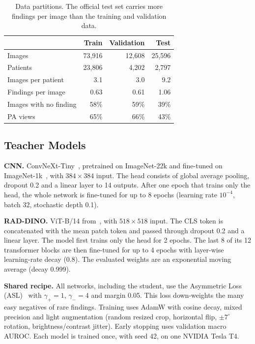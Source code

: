 \documentclass[conference]{IEEEtran}
\begin{document}
\begin{table}[t]
\centering
\caption{Data partitions. The official test set carries more findings per image than the training and validation data.}
\label{tab:data}
\begin{tabular}{@{}lrrr@{}}
\toprule
 & Train & Validation & Test \\
\midrule
Images           & 73,916 & 12,608 & 25,596 \\
Patients         & 23,806 & 4,202  & 2,797 \\
Images per patient & 3.1 & 3.0 & 9.2 \\
Findings per image & 0.63 & 0.61 & 1.06 \\
Images with no finding & 58\% & 59\% & 39\% \\
PA views         & 65\% & 66\% & 43\% \\
\bottomrule
\end{tabular}
\end{table}

\subsection{Teacher Models}
\textbf{CNN.} ConvNeXt-Tiny~\cite{liu2022convnext}, pretrained on ImageNet-22k and fine-tuned on ImageNet-1k~\cite{deng2009imagenet}, with $384\times384$ input. The head consists of global average pooling, dropout 0.2 and a linear layer to 14 outputs. After one epoch that trains only the head, the whole network is fine-tuned for up to 8 epochs (learning rate $10^{-4}$, batch 32, stochastic depth 0.1).

\textbf{RAD-DINO.} ViT-B/14 from~\cite{perezgarcia2025raddino}, with $518\times518$ input. The CLS token is concatenated with the mean patch token and passed through dropout 0.2 and a linear layer. The model first trains only the head for 2 epochs. The last 8 of its 12 transformer blocks are then fine-tuned for up to 4 epochs with layer-wise learning-rate decay (0.8). The evaluated weights are an exponential moving average (decay 0.999).

\textbf{Shared recipe.} All networks, including the student, use the Asymmetric Loss (ASL)~\cite{ridnik2021asl} with $\gamma_+=1$, $\gamma_-=4$ and margin 0.05. This loss down-weights the many easy negatives of rare findings. Training uses AdamW with cosine decay, mixed precision and light augmentation (random resized crop, horizontal flip, $\pm7^\circ$ rotation, brightness/contrast jitter). Early stopping uses validation macro AUROC. Each model is trained once, with seed 42, on one NVIDIA Tesla T4.
\end{document}
